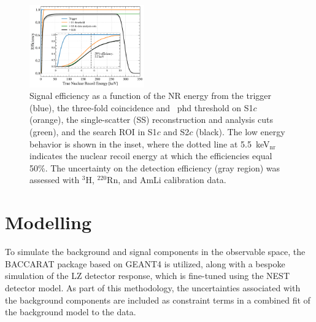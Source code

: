 \documentclass[reprint, showpacs,
preprintnumbers,
amsmath,amssymb,
aps, floatfix,
superscriptaddress,
prd, nofootinbib]{revtex4-1}
\begin{document}
\begin{figure}[t]
    \centering
    \includegraphics[trim={5 5 5 5},clip, width=0.44\textwidth]{FlatNR_efficiencies_NoSkew_ERTune}
\caption{Signal efficiency as a function of the NR energy from the trigger (blue), the three-fold coincidence and ~phd threshold on S1$c$ (orange), the single-scatter (SS) reconstruction and analysis cuts (green), and the search ROI in S1$c$ and S2$c$ (black). 
The low energy behavior is shown in the inset, where the dotted line at 5.5~keV$_{\text{nr}}$ indicates the nuclear recoil energy at which the efficiencies equal 50\%.
The uncertainty on the detection efficiency (gray region) was assessed with ${}^3$H, ${}^{220}$Rn, and AmLi calibration data. 
}
    \label{fig:acceptances}
\end{figure}


\section{\label{sec:model_and_stats}Modelling}
To simulate the background and signal components in the observable space, the BACCARAT package based on GEANT4 \cite{LZ:simulations_2021, ALLISON2016} is utilized, along with a bespoke simulation of the LZ detector response, which is fine-tuned using the NEST detector model. As part of this methodology, the uncertainties associated with the background components are included as constraint terms in a combined fit of the background model to the data.
\end{document}
